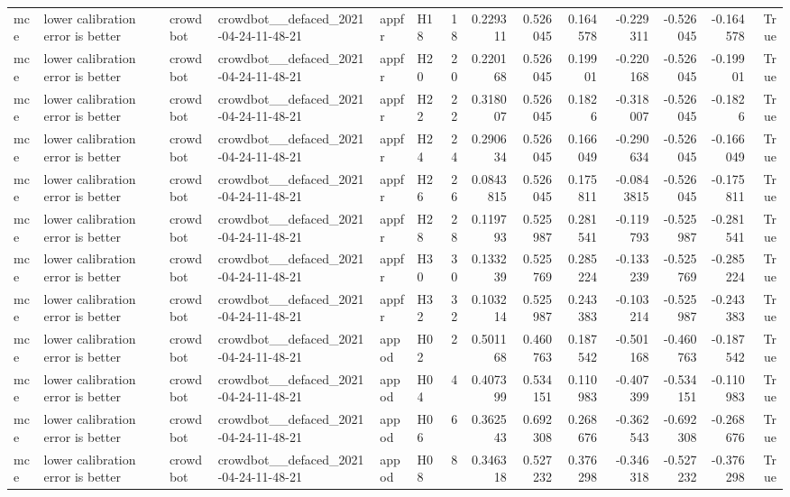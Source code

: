 \begin{longtable}{llllllrrrrrrrr}
mce & lower calibration error is better & crowdbot & crowdbot\_\_defaced\_2021-04-24-11-48-21 & appfr & H18 & 18 & 0.229311 & 0.526045 & 0.164578 & -0.229311 & -0.526045 & -0.164578 & True \\
mce & lower calibration error is better & crowdbot & crowdbot\_\_defaced\_2021-04-24-11-48-21 & appfr & H20 & 20 & 0.220168 & 0.526045 & 0.19901 & -0.220168 & -0.526045 & -0.19901 & True \\
mce & lower calibration error is better & crowdbot & crowdbot\_\_defaced\_2021-04-24-11-48-21 & appfr & H22 & 22 & 0.318007 & 0.526045 & 0.1826 & -0.318007 & -0.526045 & -0.1826 & True \\
mce & lower calibration error is better & crowdbot & crowdbot\_\_defaced\_2021-04-24-11-48-21 & appfr & H24 & 24 & 0.290634 & 0.526045 & 0.166049 & -0.290634 & -0.526045 & -0.166049 & True \\
mce & lower calibration error is better & crowdbot & crowdbot\_\_defaced\_2021-04-24-11-48-21 & appfr & H26 & 26 & 0.0843815 & 0.526045 & 0.175811 & -0.0843815 & -0.526045 & -0.175811 & True \\
mce & lower calibration error is better & crowdbot & crowdbot\_\_defaced\_2021-04-24-11-48-21 & appfr & H28 & 28 & 0.119793 & 0.525987 & 0.281541 & -0.119793 & -0.525987 & -0.281541 & True \\
mce & lower calibration error is better & crowdbot & crowdbot\_\_defaced\_2021-04-24-11-48-21 & appfr & H30 & 30 & 0.133239 & 0.525769 & 0.285224 & -0.133239 & -0.525769 & -0.285224 & True \\
mce & lower calibration error is better & crowdbot & crowdbot\_\_defaced\_2021-04-24-11-48-21 & appfr & H32 & 32 & 0.103214 & 0.525987 & 0.243383 & -0.103214 & -0.525987 & -0.243383 & True \\
mce & lower calibration error is better & crowdbot & crowdbot\_\_defaced\_2021-04-24-11-48-21 & appod & H02 & 2 & 0.501168 & 0.460763 & 0.187542 & -0.501168 & -0.460763 & -0.187542 & True \\
mce & lower calibration error is better & crowdbot & crowdbot\_\_defaced\_2021-04-24-11-48-21 & appod & H04 & 4 & 0.407399 & 0.534151 & 0.110983 & -0.407399 & -0.534151 & -0.110983 & True \\
mce & lower calibration error is better & crowdbot & crowdbot\_\_defaced\_2021-04-24-11-48-21 & appod & H06 & 6 & 0.362543 & 0.692308 & 0.268676 & -0.362543 & -0.692308 & -0.268676 & True \\
mce & lower calibration error is better & crowdbot & crowdbot\_\_defaced\_2021-04-24-11-48-21 & appod & H08 & 8 & 0.346318 & 0.527232 & 0.376298 & -0.346318 & -0.527232 & -0.376298 & True \\

\end{longtable}
